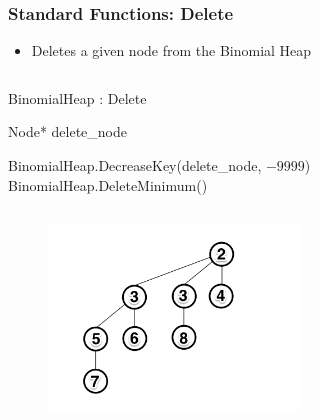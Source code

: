 \documentclass[13pt]{beamer}
\begin{document}
\begin{frame}
\frametitle{Standard Functions: Delete}
  \begin{itemize}
    \item Deletes a given node from the Binomial Heap
  \end{itemize}

  \begin{columns}[T] %
    \begin{column}[T]{9cm} %
        \begin{algorithm}[H]
        \small
        \caption{BinomialHeap : Delete}
        \begin{algorithmic}
          \REQUIRE Node* delete\_node

          \STATE BinomialHeap.DecreaseKey(delete\_node, $-9999$)
          \STATE BinomialHeap.DeleteMinimum()
        \end{algorithmic}
        \end{algorithm}
    \end{column}
  \end{columns}

  \begin{figure}
    \includegraphics[height=5cm]{./img/postmerge.png}
  \end{figure}

\end{frame}
\end{document}
